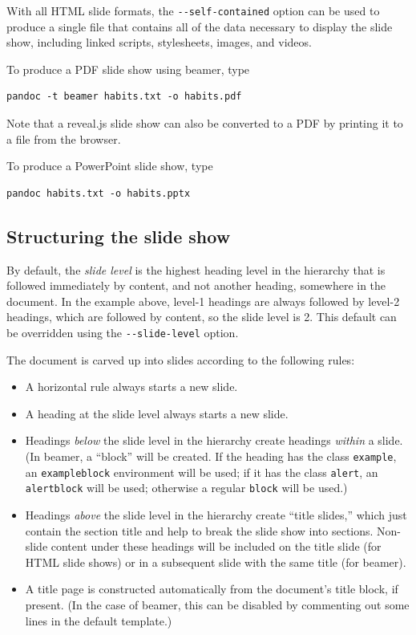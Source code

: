 \documentclass[
]{article}
\begin{document}
With all HTML slide formats, the \texttt{-\/-self-contained} option can
be used to produce a single file that contains all of the data necessary
to display the slide show, including linked scripts, stylesheets,
images, and videos.

To produce a PDF slide show using beamer, type

\begin{verbatim}
pandoc -t beamer habits.txt -o habits.pdf
\end{verbatim}

Note that a reveal.js slide show can also be converted to a PDF by
printing it to a file from the browser.

To produce a PowerPoint slide show, type

\begin{verbatim}
pandoc habits.txt -o habits.pptx
\end{verbatim}

\hypertarget{structuring-the-slide-show}{%
\subsection{Structuring the slide
show}\label{structuring-the-slide-show}}

By default, the \emph{slide level} is the highest heading level in the
hierarchy that is followed immediately by content, and not another
heading, somewhere in the document. In the example above, level-1
headings are always followed by level-2 headings, which are followed by
content, so the slide level is 2. This default can be overridden using
the \texttt{-\/-slide-level} option.

The document is carved up into slides according to the following rules:

\begin{itemize}
\item
  A horizontal rule always starts a new slide.
\item
  A heading at the slide level always starts a new slide.
\item
  Headings \emph{below} the slide level in the hierarchy create headings
  \emph{within} a slide. (In beamer, a ``block'' will be created. If the
  heading has the class \texttt{example}, an \texttt{exampleblock}
  environment will be used; if it has the class \texttt{alert}, an
  \texttt{alertblock} will be used; otherwise a regular \texttt{block}
  will be used.)
\item
  Headings \emph{above} the slide level in the hierarchy create ``title
  slides,'' which just contain the section title and help to break the
  slide show into sections. Non-slide content under these headings will
  be included on the title slide (for HTML slide shows) or in a
  subsequent slide with the same title (for beamer).
\item
  A title page is constructed automatically from the document's title
  block, if present. (In the case of beamer, this can be disabled by
  commenting out some lines in the default template.)
\end{itemize}
\end{document}
